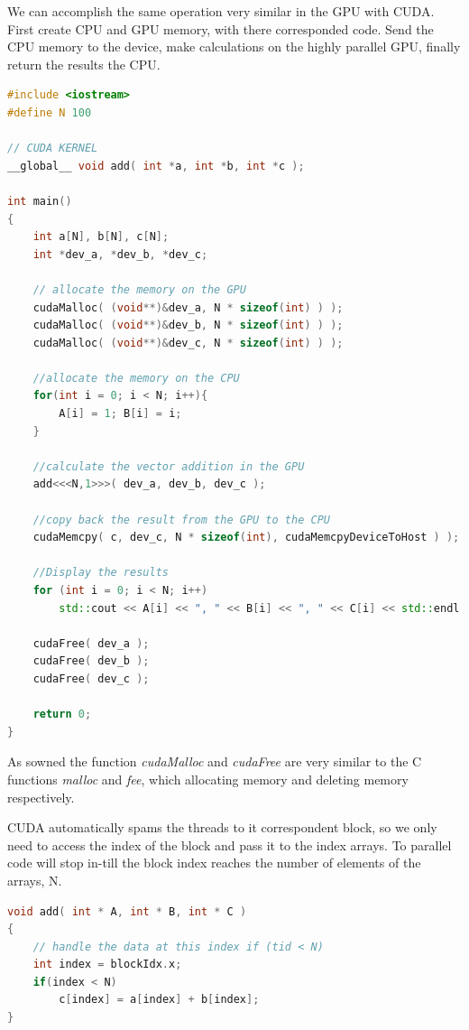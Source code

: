 We can accomplish the same operation very similar in the GPU with CUDA. First create CPU and GPU memory, with there corresponded code. Send the CPU memory to the device, make calculations on the highly parallel GPU, finally return the results the CPU.

\begin{lstlisting}[language=C++, caption={GPU Vector Addition}]
#include <iostream>
#define N 100

// CUDA KERNEL
__global__ void add( int *a, int *b, int *c );

int main()
{
    int a[N], b[N], c[N];
    int *dev_a, *dev_b, *dev_c;

    // allocate the memory on the GPU
    cudaMalloc( (void**)&dev_a, N * sizeof(int) ) );
    cudaMalloc( (void**)&dev_b, N * sizeof(int) ) );
    cudaMalloc( (void**)&dev_c, N * sizeof(int) ) );
    
    //allocate the memory on the CPU
    for(int i = 0; i < N; i++){
        A[i] = 1; B[i] = i;
    }
    
    //calculate the vector addition in the GPU
    add<<<N,1>>>( dev_a, dev_b, dev_c );
    
    //copy back the result from the GPU to the CPU 
    cudaMemcpy( c, dev_c, N * sizeof(int), cudaMemcpyDeviceToHost ) );
     
    //Display the results
    for (int i = 0; i < N; i++)
        std::cout << A[i] << ", " << B[i] << ", " << C[i] << std::endl;
    
    cudaFree( dev_a );
    cudaFree( dev_b );
    cudaFree( dev_c );
    
    return 0;
}
\end{lstlisting}

As sowned the function \textit{cudaMalloc} and \textit{cudaFree} are very similar to the C functions \textit{malloc} and \textit{fee}, which allocating memory and deleting memory respectively.

CUDA automatically spams the threads to it correspondent block, so we only need to access the index of the block and pass it to the index arrays. To parallel code will stop in-till the block index reaches the number of elements of the arrays, N.

\begin{lstlisting}[language=C++, caption={GPU Vector Addition}]
void add( int * A, int * B, int * C )
{
    // handle the data at this index if (tid < N)
    int index = blockIdx.x; 
    if(index < N)
        c[index] = a[index] + b[index];
}
\end{lstlisting}

